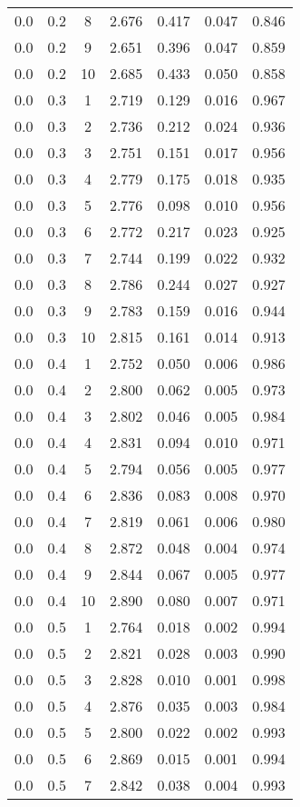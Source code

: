 \begin{tabular}{|c|c|c|c|c|c|c|}
0.0 & 0.2 & 8 & 2.676 & 0.417 & 0.047 & 0.846 \\
0.0 & 0.2 & 9 & 2.651 & 0.396 & 0.047 & 0.859 \\
0.0 & 0.2 & 10 & 2.685 & 0.433 & 0.050 & 0.858 \\
0.0 & 0.3 & 1 & 2.719 & 0.129 & 0.016 & 0.967 \\
0.0 & 0.3 & 2 & 2.736 & 0.212 & 0.024 & 0.936 \\
0.0 & 0.3 & 3 & 2.751 & 0.151 & 0.017 & 0.956 \\
0.0 & 0.3 & 4 & 2.779 & 0.175 & 0.018 & 0.935 \\
0.0 & 0.3 & 5 & 2.776 & 0.098 & 0.010 & 0.956 \\
0.0 & 0.3 & 6 & 2.772 & 0.217 & 0.023 & 0.925 \\
0.0 & 0.3 & 7 & 2.744 & 0.199 & 0.022 & 0.932 \\
0.0 & 0.3 & 8 & 2.786 & 0.244 & 0.027 & 0.927 \\
0.0 & 0.3 & 9 & 2.783 & 0.159 & 0.016 & 0.944 \\
0.0 & 0.3 & 10 & 2.815 & 0.161 & 0.014 & 0.913 \\
0.0 & 0.4 & 1 & 2.752 & 0.050 & 0.006 & 0.986 \\
0.0 & 0.4 & 2 & 2.800 & 0.062 & 0.005 & 0.973 \\
0.0 & 0.4 & 3 & 2.802 & 0.046 & 0.005 & 0.984 \\
0.0 & 0.4 & 4 & 2.831 & 0.094 & 0.010 & 0.971 \\
0.0 & 0.4 & 5 & 2.794 & 0.056 & 0.005 & 0.977 \\
0.0 & 0.4 & 6 & 2.836 & 0.083 & 0.008 & 0.970 \\
0.0 & 0.4 & 7 & 2.819 & 0.061 & 0.006 & 0.980 \\
0.0 & 0.4 & 8 & 2.872 & 0.048 & 0.004 & 0.974 \\
0.0 & 0.4 & 9 & 2.844 & 0.067 & 0.005 & 0.977 \\
0.0 & 0.4 & 10 & 2.890 & 0.080 & 0.007 & 0.971 \\
0.0 & 0.5 & 1 & 2.764 & 0.018 & 0.002 & 0.994 \\
0.0 & 0.5 & 2 & 2.821 & 0.028 & 0.003 & 0.990 \\
0.0 & 0.5 & 3 & 2.828 & 0.010 & 0.001 & 0.998 \\
0.0 & 0.5 & 4 & 2.876 & 0.035 & 0.003 & 0.984 \\
0.0 & 0.5 & 5 & 2.800 & 0.022 & 0.002 & 0.993 \\
0.0 & 0.5 & 6 & 2.869 & 0.015 & 0.001 & 0.994 \\
0.0 & 0.5 & 7 & 2.842 & 0.038 & 0.004 & 0.993 \\

\end{tabular}
